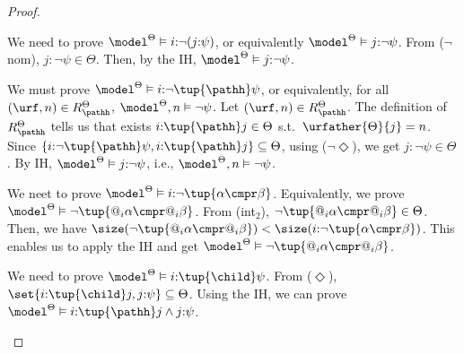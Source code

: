\documentclass[10pt,a4paper]{amsart}
\theoremstyle{definition}
\theoremstyle{remark}
\begin{document}
\begin{proof}
\begin{description}
\begin{description}
                We need to prove $\model^{\Theta} \vDash {i{:}\lnot(j{:}\psi)}$, or equivalently
                    $\model^{\Theta} \vDash {j{:}\lnot\psi}$.
                From ($\lnot$nom), $j{:}\lnot\psi \in \Theta$.
                Then, by the IH, $\model^{\Theta} \vDash j{:}\lnot \psi$.
            \item[($\varphi = i{:}\lnot \tup{\pathh} \psi$)]
                We must prove $\model^{\Theta} \vDash {i{:}\lnot \tup{\pathh}\psi}$, or equivalently,
                for all $(\urf,n) \in R^{\Theta}_{\pathh}$, ${\model^{\Theta}, n \vDash \lnot\psi}$.
                Let $(\urf,n) \in R^{\Theta}_{\pathh}$.
                The definition of $R^{\Theta}_{\pathh}$ tells us that exists $i{:}\tup{\pathh}j \in \Theta$ s.t.\ $\urfather{\Theta}{j} = n$.
                Since $\{i{:}\lnot\tup{\pathh}\psi, i{:}\tup{\pathh}j\} \subseteq \Theta$, using ($\lnot \Diamond$), we get $j{:}\lnot\psi \in\Theta$.
                By IH, $\model^\Theta \vDash j{:}\lnot \psi$, i.e., $\model^\Theta, n \vDash \lnot \psi$.
            \item[($\varphi = i{:}\lnot\tup{\alpha \cmpr \beta}$)]
                We neet to prove $\model^{\Theta} \vDash i{:} \lnot \tup{\alpha \cmpr \beta}$.
                Equivalently, we prove $\model^{\Theta} \vDash {\lnot \tup{@_i\alpha \cmpr @_i\beta}}$.
                From (int$_2$), $\lnot\tup{ @_i \alpha \cmpr @_i \beta} \in \Theta$.
                Then, we have $\size(\lnot\tup{ @_i \alpha \cmpr @_i \beta}) < \size(i{:} \lnot \tup{\alpha \cmpr \beta})$.
                This enables us to apply the IH and get $\model^\Theta \vDash \lnot\tup{@_i \alpha \cmpr @_i \beta}$.
            \item[($\varphi = i{:}\tup{\child}\psi$)] 
                We need to prove $\model^{\Theta} \vDash {i{:}\tup{\child}\psi}$.
                From ($\Diamond$), $\set{i{:}\tup{\child}j, j{:}\psi} \subseteq \Theta$. 
                Using the IH, we can prove $\model^\Theta \vDash i{:}\tup{\pathh}j \land j{:}\psi$.

\end{description}
\end{description}
\end{proof}
\end{document}
